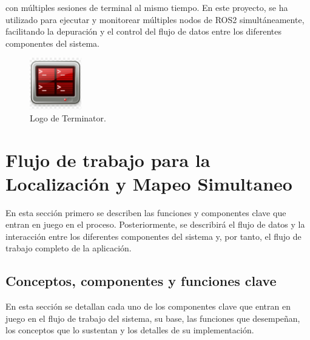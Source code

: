 \documentclass[12pt, a4paper, twoside]{article}
\begin{document}
\begin{itemize}
      con múltiples sesiones de terminal al mismo tiempo. En este proyecto, se ha utilizado para ejecutar y monitorear múltiples 
      nodos de ROS2\cite{doi:10.1126/scirobotics.abm6074} simultáneamente, facilitando la depuración y el control del flujo de datos entre los diferentes componentes del sistema.
      \begin{figure}[h]
        \centering
          \includegraphics[width=0.2\textwidth]{Terminator.png} 
        \caption{Logo de Terminator\cite{terminator}.}
      \end{figure} 
\end{itemize}

\section{Flujo de trabajo para la Localización y Mapeo Simultaneo}

En esta sección primero se describen las funciones y componentes clave que entran en juego en el proceso. Posteriormente, se describirá 
el flujo de datos y la interacción entre los diferentes componentes del sistema y, por tanto, el flujo de trabajo 
completo de la aplicación.

\subsection{Conceptos, componentes y funciones clave}
En esta sección se detallan cada uno de los componentes clave que entran en juego en el flujo de trabajo del sistema, su base,
las funciones que desempeñan, los conceptos que lo sustentan y los detalles de su implementación.
\end{document}
